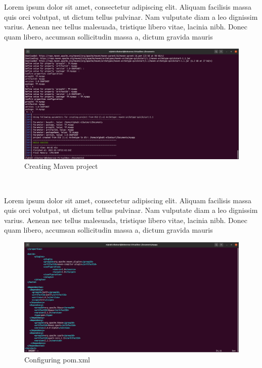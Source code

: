 \begin{spacing}{1.2}
\par Lorem ipsum dolor sit amet, consectetur adipiscing elit. Aliquam facilisis massa quis orci volutpat, ut dictum tellus pulvinar. Nam vulputate diam a leo dignissim varius. Aenean nec tellus malesuada, tristique libero vitae, lacinia nibh. Donec quam libero, accumsan sollicitudin massa a, dictum gravida mauris
\\
\begin{figure}[!htb] 
\begin{center} 
\includegraphics[width=1\linewidth]{Pictures/HBase/Data processing with Spark/Preparation of the environment/Creating Maven project} 
\end{center} 
\caption{Creating Maven project} 
\end{figure}  \FloatBarrier
\\

\par Lorem ipsum dolor sit amet, consectetur adipiscing elit. Aliquam facilisis massa quis orci volutpat, ut dictum tellus pulvinar. Nam vulputate diam a leo dignissim varius. Aenean nec tellus malesuada, tristique libero vitae, lacinia nibh. Donec quam libero, accumsan sollicitudin massa a, dictum gravida mauris
\\
\begin{figure}[!htb] 
\begin{center} 
\includegraphics[width=1\linewidth]{Pictures/HBase/Data processing with Spark/Preparation of the environment/Configuring pom.xml} 
\end{center} 
\caption{Configuring pom.xml} 
\end{figure}  \FloatBarrier
\\


\end{spacing}
